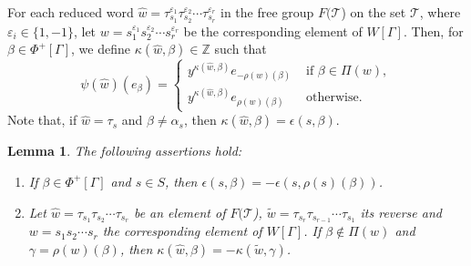 \documentclass[12pt]{amsart}
\newtheorem{lemma}[equation]{Lemma}
\numberwithin{equation}{section}
\begin{document}
For each reduced word $\widehat{w}= \tau_{s_1}^{\varepsilon_1}\tau_{s_2}^{\varepsilon_2}\cdots \tau_{s_r}^{\varepsilon_r}$ in the free group $F(\mathcal{T}$) on the set $\mathcal{T}$, where $\varepsilon_i\in \{1,-1\}$, let $w=s_1^{\varepsilon_1}s_2^{\varepsilon_2}\cdots s_r^{\varepsilon_r}$ be the corresponding element of $W[\Gamma]$. Then, for $\beta \in \Phi^{+}[\Gamma]$, we define $\kappa(\widehat{w}, \beta) \in \mathbb Z$ such that   
\begin{equation}\label{kappa def}
 \psi(\widehat{w})(e_\beta)=\begin{cases} y^{\kappa(\widehat{w}, \beta)} e_{-\rho(w)(\beta)}  & \text{ if } \beta\in \Pi(w), \\ 
y^{\kappa(\widehat{w}, \beta)} e_{\rho(w)(\beta)} & \text{ otherwise}.
\end{cases}
\end{equation}
Note that, if $\widehat{w}=\tau_s$ and $\beta \neq \alpha_s$, then  $\kappa(\widehat{w}, \beta)=\epsilon(s,\beta)$.
\par

\begin{lemma}\label{lemma on representation}
The following assertions hold:
\begin{enumerate}
\item If $\beta \in \Phi^{+}[\Gamma]$ and $s \in S$, then $\epsilon(s,\beta)=-\epsilon (s, \rho(s)(\beta))$.
\item Let $\widehat{w}=\tau_{s_1}\tau_{s_2}\cdots \tau_{s_r}$ be an element of $F(\mathcal{T}$), $\widetilde{w}=\tau_{s_r}\tau_{s_{r-1}}\cdots \tau_{s_1}$ its reverse and $w=s_1 s_2 \cdots s_r$ the corresponding element of $W[\Gamma]$. If $\beta \not\in \Pi(w)$ and $\gamma =\rho(w)(\beta)$, then $\kappa(\widehat{w}, \beta)=-\kappa(\widetilde{w}, \gamma)$.
\end{enumerate}
\end{lemma}
\end{document}
